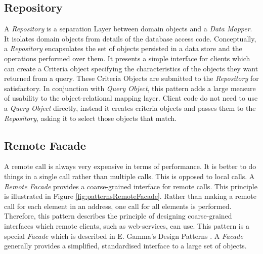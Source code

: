 		\subsection{Repository}
		\label{subsec:repository}
			A \textit{Repository} is a separation Layer between domain objects and a \textit{Data Mapper}.
			It isolates domain objects from details of the database access code. 
			Conceptually, a \textit{Repository}
			encapsulates the set of objects persisted in a data store and the operations performed over them.
			It presents a simple interface for clients which can create a Criteria object specifying
			the characteristics of the objects they want returned from a query. These Criteria Objects
			are submitted to the \textit{Repository} for satisfactory. In conjunction with 
			\textit{Query Object}, this pattern adds a large measure of 
			usability to the object-relational mapping layer. Client code do not need to use a \textit{Query Object}
			directly, instead it creates criteria objects and passes them to the \textit{Repository}, asking it 
			to select those objects that match.
			
		\subsection{Remote Facade}
		\label{subsec:remoteFacade}
			A remote call is always very expensive in terms of performance. It is better to do things in a
			single call rather than multiple calls. This is opposed to local calls. A \textit{Remote Facade}
			provides a coarse-grained interface for remote calls. This principle is illustrated in Figure
			\ref{fig:patternsRemoteFacade}. Rather than making a remote call for each element in an address,
			one call for all elements is performed. Therefore, this pattern describes the principle
			of designing coarse-grained interfaces which remote clients, such as web-services, can use.
			This pattern is a special \textit{Facade} which is described in E. Gamma's Design Patterns \cite{Gamma97}.
			A \textit{Facade} generally provides a simplified, standardised interface to a large set of objects.
			
